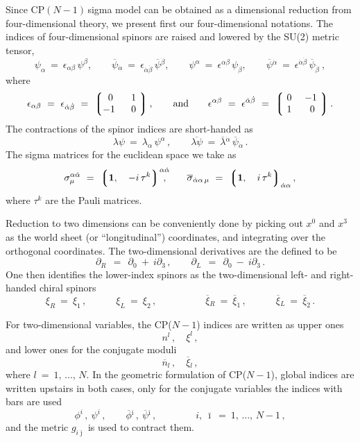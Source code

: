 \documentclass[12pt]{article}
\def\beq{\begin{equation}}
\def\eeq{\end{equation}}
\newcommand{\p}{\partial}
\newcommand{\ov}{\overline}
\newcommand{\lgr}{\left\lgroup}
\newcommand{\rgr}{\right\rgroup}
\newcommand{\cpn}{CP$(N-1)\,$}
\newcommand{\bi}{{\bar \imath}}
\newcommand{\bj}{{\bar \jmath}}
\begin{document}
\setcounter{equation}{0}

Since \cpn sigma model can be obtained as a dimensional reduction from four-dimensional theory,
we present first our four-dimensional notations.
The indices of four-dimensional spinors are raised and lowered by the SU(2) metric tensor,
\beq
	\psi_\alpha ~=~ \epsilon_{\alpha\beta}\, \psi^\beta, \qquad
	\ov{\psi}{}_{\dot{\alpha}} ~=~ \epsilon_{\dot{\alpha}\dot{\beta}}\, \ov{\psi}{}^{\dot\beta}, \qquad 
	\psi^\alpha ~=~ \epsilon^{\alpha\beta}\, \psi_\beta, \qquad
	\ov{\psi}{}^{\dot{\alpha}} ~=~ \epsilon^{\dot\alpha\dot\beta}\, \ov{\psi}{}_{\dot\beta}~,
\eeq
	where
\beq
	\epsilon_{\alpha\beta} ~=~ \epsilon_{\dot\alpha\dot\beta} ~=~
			\lgr \begin{matrix}
			     	\ 0\  &  \ 1\   \\
				 -1\  &  \ 0\  
			     \end{matrix} \rgr,
	\qquad \text{and} \qquad
	\epsilon^{\alpha\beta} ~=~ \epsilon^{\dot\alpha\dot\beta} ~=~
			\lgr \begin{matrix}
				\ 0\ &   -1\   \\
				\ 1\ &  \ 0\ 
			     \end{matrix} \rgr.
\eeq
The contractions of the spinor indices are short-handed as
\beq
	\lambda\psi ~=~ \lambda_\alpha\, \psi^\alpha\,, \qquad
	\ov{\lambda\psi} ~=~  \ov{\lambda}{}^{\dot\alpha}\, \ov{\psi}{}_{\dot\alpha}\,.
\eeq
The sigma matrices for the euclidean space we take as
\beq
	\sigma^{\alpha\dot\alpha}_\mu ~=~  \lgr {\bf 1},\quad -i\,\tau^k \rgr^{\alpha\dot{\alpha}}
	\hspace{-2.0ex},
	\qquad
	\ov{\sigma}{}_{\dot\alpha\alpha\, \mu} ~=~ 
			\lgr {\bf 1},\quad i\, \tau^k \rgr_{\dot\alpha\alpha},
\eeq
where $ \tau^k $ are the Pauli matrices.

Reduction to two dimensions can be conveniently done by picking out $ x^0 $ and $ x^3 $ 
as the world sheet (or ``longitudinal'') coordinates, and integrating over the orthogonal coordinates. 
The two-dimensional derivatives are the defined to be
\beq
	\p_R  ~~=~~ \p_0 ~+~ i\p_3\,, \qquad   \p_L ~~=~~ \p_0 ~-~ i\p_3\,.
\eeq
One then identifies the lower-index spinors as the two-dimensional left- and right-handed chiral spinors
\beq
	\xi_{R} ~=~ \xi_{1}\,, \quad\qquad
	\xi_{L} ~=~ \xi_{2}\,, \quad\qquad\qquad
	\ov{\xi}{}_{R} ~=~ \ov{\xi}{}_{\dot{1}}\,, \quad\qquad
	\ov{\xi}{}_{L} ~=~ \ov{\xi}{}_{\dot{2}}\,.
\eeq

For two-dimensional variables, the CP($N-1$) indices are written as upper ones 
\[
	n^l\,, \quad \xi^l\,,
\]
and lower ones for the conjugate moduli
\[
	\ov{n}{}_l\,, \quad \ov{\xi}{}_l\,, 
\]
where $ l~=~1,\, ...,\, N $.
In the geometric formulation of CP($N-1$), global indices are written upstairs in both cases, only
for the conjugate variables the indices with bars are used 
\[
	\phi^i\,,\ \psi^i\,, \qquad \ov{\phi}{}^\bi\,,\ \ov{\psi}{}^\bi\,, 
	\qquad\qquad i,\ \bi ~=~ 1,\,...,\,N-1\,,
\]
and the metric $ g_{i\bj} $ is used to contract them.
\end{document}
